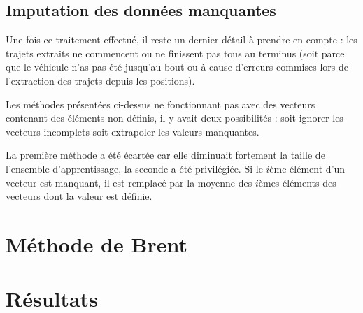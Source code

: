 \documentclass[letterpaper]{article}
\begin{document}
\begin{appendices}
\subsection{Imputation des données manquantes}

Une fois ce traitement effectué, il reste un dernier détail à prendre en compte : les trajets extraits ne commencent ou ne finissent pas tous au terminus (soit parce que le véhicule n'as pas été jusqu'au bout ou à cause d'erreurs commises lors de l'extraction des trajets depuis les positions).

Les méthodes présentées ci-dessus ne fonctionnant pas avec des vecteurs contenant des éléments non définis, il y avait deux possibilités : soit ignorer les vecteurs incomplets soit extrapoler les valeurs manquantes.

La première méthode a été écartée car elle diminuait fortement la taille de l'ensemble d'apprentissage, la seconde a été privilégiée. Si le $i$ème élément d'un vecteur est manquant, il est remplacé par la moyenne des $i$èmes éléments des vecteurs dont la valeur est définie.



\section{Méthode de Brent}

\section{Résultats}


\end{appendices}
\end{document}
